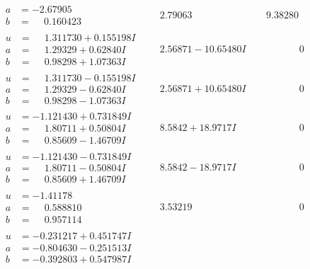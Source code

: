 \documentclass[1p]{elsarticle_modified}
\theoremstyle{definition}
\begin{document}
$$\begin{array}{c|c|c}
\begin{aligned}
a &= -2.67905\phantom{ +0.000000I} \\
b &= \phantom{-}0.160423\phantom{ +0.000000I}\end{aligned}
 & \phantom{-}2.79063\phantom{ +0.000000I} & \phantom{-}9.38280\phantom{ +0.000000I} \\ \hline\begin{aligned}
u &= \phantom{-}1.311730 + 0.155198 I \\
a &= \phantom{-}1.29329 + 0.62840 I \\
b &= \phantom{-}0.98298 + 1.07363 I\end{aligned}
 & \phantom{-}2.56871 - 10.65480 I & \phantom{-0.000000 } 0 \\ \hline\begin{aligned}
u &= \phantom{-}1.311730 - 0.155198 I \\
a &= \phantom{-}1.29329 - 0.62840 I \\
b &= \phantom{-}0.98298 - 1.07363 I\end{aligned}
 & \phantom{-}2.56871 + 10.65480 I & \phantom{-0.000000 } 0 \\ \hline\begin{aligned}
u &= -1.121430 + 0.731849 I \\
a &= \phantom{-}1.80711 + 0.50804 I \\
b &= \phantom{-}0.85609 - 1.46709 I\end{aligned}
 & \phantom{-}8.5842 + 18.9717 I & \phantom{-0.000000 } 0 \\ \hline\begin{aligned}
u &= -1.121430 - 0.731849 I \\
a &= \phantom{-}1.80711 - 0.50804 I \\
b &= \phantom{-}0.85609 + 1.46709 I\end{aligned}
 & \phantom{-}8.5842 - 18.9717 I & \phantom{-0.000000 } 0 \\ \hline\begin{aligned}
u &= -1.41178\phantom{ +0.000000I} \\
a &= \phantom{-}0.588810\phantom{ +0.000000I} \\
b &= \phantom{-}0.957114\phantom{ +0.000000I}\end{aligned}
 & \phantom{-}3.53219\phantom{ +0.000000I} & \phantom{-0.000000 } 0 \\ \hline\begin{aligned}
u &= -0.231217 + 0.451747 I \\
a &= -0.804630 - 0.251513 I \\
b &= -0.392803 + 0.547987 I\end{aligned}

\end{array}$$
\end{document}
